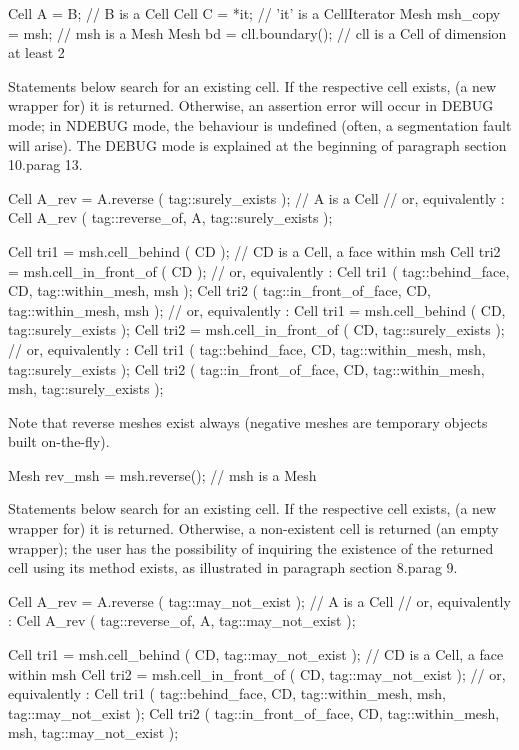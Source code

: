 \verbatim
   Cell A = B;  // B is a Cell
   Cell C = *it;  // 'it' is a CellIterator
   Mesh msh_copy = msh;  // msh is a Mesh
   Mesh bd = cll.boundary();  // cll is a Cell of dimension at least 2
\endverbatim

Statements below search for an existing cell.
If the respective cell exists, (a new wrapper for) it is returned.
Otherwise, an {\codett assertion error} will occur in {\codett DEBUG} mode;
in {\codett NDEBUG} mode, the behaviour is undefined (often, a {\codett segmentation fault}
will arise).
The {\codett DEBUG} mode is explained at the beginning of paragraph \numb section
10.\numb parag 13.

\verbatim
   Cell A_rev = A.reverse ( tag::surely_exists );  //  A is a Cell
   // or, equivalently :
   Cell A_rev ( tag::reverse_of, A, tag::surely_exists );

   Cell tri1 = msh.cell_behind ( CD );  //  CD is a Cell, a face within msh
   Cell tri2 = msh.cell_in_front_of ( CD );
   // or, equivalently :
   Cell tri1 ( tag::behind_face, CD, tag::within_mesh, msh );
   Cell tri2 ( tag::in_front_of_face, CD, tag::within_mesh, msh );
   // or, equivalently :
   Cell tri1 = msh.cell_behind ( CD, tag::surely_exists );
   Cell tri2 = msh.cell_in_front_of ( CD, tag::surely_exists );
   // or, equivalently :
   Cell tri1 ( tag::behind_face, CD, tag::within_mesh, msh, tag::surely_exists );
   Cell tri2 ( tag::in_front_of_face, CD,
               tag::within_mesh, msh, tag::surely_exists );
\endverbatim

Note that reverse meshes exist always (negative meshes are temporary objects built
on-the-fly).

\verbatim
   Mesh rev_msh = msh.reverse();  // msh is a Mesh
\endverbatim

Statements below search for an existing cell.
If the respective cell exists, (a new wrapper for) it is returned.
Otherwise, a non-existent cell is returned
(an empty wrapper); the user has the possibility of inquiring the existence
of the returned cell using its method {\codett exists}, as illustrated in paragraph
\numb section 8.\numb parag 9.

\verbatim
   Cell A_rev = A.reverse ( tag::may_not_exist );  //  A is a Cell
   // or, equivalently :
   Cell A_rev ( tag::reverse_of, A, tag::may_not_exist );
   
   Cell tri1 = msh.cell_behind ( CD, tag::may_not_exist );
   //  CD is a Cell, a face within msh
   Cell tri2 = msh.cell_in_front_of ( CD, tag::may_not_exist );
   // or, equivalently :
   Cell tri1 ( tag::behind_face, CD, tag::within_mesh, msh, tag::may_not_exist );
   Cell tri2
      ( tag::in_front_of_face, CD, tag::within_mesh, msh, tag::may_not_exist );
\endverbatim

